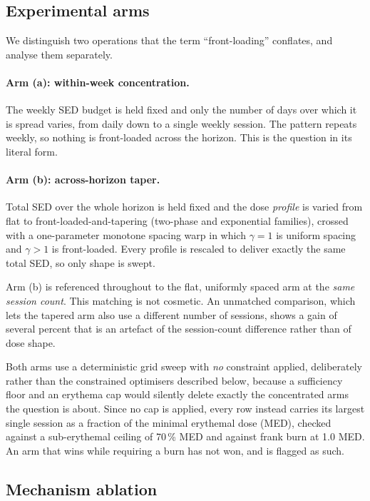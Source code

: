 \documentclass[11pt]{article}
\newcommand{\SED}{SED}
\begin{document}
\subsection{Experimental arms}

We distinguish two operations that the term ``front-loading'' conflates,
and analyse them separately.

\paragraph{Arm (a): within-week concentration.} The weekly \SED{}
budget is held fixed and only the number of days over which it is
spread varies, from daily down to a single weekly session. The pattern
repeats weekly, so nothing is front-loaded across the horizon. This is
the question in its literal form.

\paragraph{Arm (b): across-horizon taper.} Total \SED{} over the whole
horizon is held fixed and the dose \emph{profile} is varied from flat
to front-loaded-and-tapering (two-phase and exponential families),
crossed with a one-parameter monotone spacing warp in which
$\gamma = 1$ is uniform spacing and $\gamma > 1$ is front-loaded.
Every profile is rescaled to deliver exactly the same total \SED{}, so
only shape is swept.

Arm (b) is referenced throughout to the flat, uniformly spaced arm at
the \emph{same session count}. This matching is not cosmetic. An
unmatched comparison, which lets the tapered arm also use a different
number of sessions, shows a gain of several percent that is an
artefact of the session-count difference rather than of dose shape.

Both arms use a deterministic grid sweep with \emph{no} constraint
applied, deliberately rather than the constrained optimisers described
below, because a sufficiency floor and an erythema cap would silently
delete exactly the concentrated arms the question is about. Since no
cap is applied, every row instead carries its largest single session
as a fraction of the minimal erythemal dose (MED), checked against a
sub-erythemal ceiling of 70\,\% MED and against frank burn at
1.0 MED. An arm that wins while requiring a burn has not won, and is
flagged as such.

\subsection{Mechanism ablation}
\label{sec:ablation}
\end{document}
